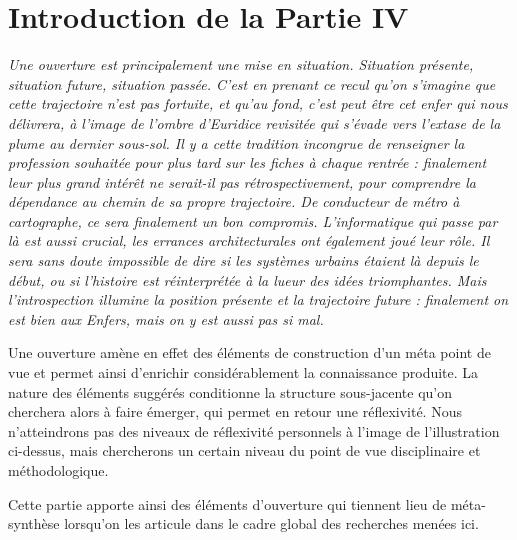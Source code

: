 





\chapter*{Introduction de la Partie IV}







\textit{Une ouverture est principalement une mise en situation. Situation présente, situation future, situation passée. C'est en prenant ce recul qu'on s'imagine que cette trajectoire n'est pas fortuite, et qu'au fond, c'est peut être cet enfer qui nous délivrera, à l'image de l'ombre d'Euridice revisitée qui s'évade vers l'extase de la plume au dernier sous-sol. Il y a cette tradition incongrue de renseigner la profession souhaitée pour plus tard sur les fiches à chaque rentrée : finalement leur plus grand intérêt ne serait-il pas rétrospectivement, pour comprendre la dépendance au chemin de sa propre trajectoire. De conducteur de métro à cartographe, ce sera finalement un bon compromis. L'informatique qui passe par là est aussi crucial, les errances architecturales ont également joué leur rôle. Il sera sans doute impossible de dire si les systèmes urbains étaient là depuis le début, ou si l'histoire est réinterprétée à la lueur des idées triomphantes. Mais l'introspection illumine la position présente et la trajectoire future : finalement on est bien aux Enfers, mais on y est aussi pas si mal.}


\bigskip

Une ouverture amène en effet des éléments de construction d'un méta point de vue et permet ainsi d'enrichir considérablement la connaissance produite. La nature des éléments suggérés conditionne la structure sous-jacente qu'on cherchera alors à faire émerger, qui permet en retour une réflexivité. Nous n'atteindrons pas des niveaux de réflexivité personnels à l'image de l'illustration ci-dessus, mais chercherons un certain niveau du point de vue disciplinaire et méthodologique.

Cette partie apporte ainsi des éléments d'ouverture qui tiennent lieu de méta-synthèse lorsqu'on les articule dans le cadre global des recherches menées ici.

